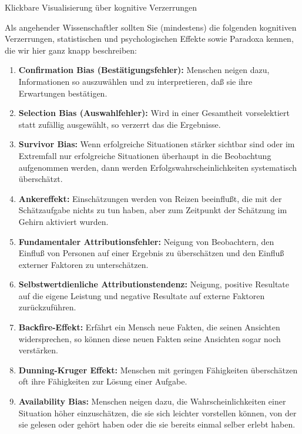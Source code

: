 

{Klickbare Visualisierung über kognitive Verzerrungen}
{}
{\href{https://upload.wikimedia.org/wikipedia/commons/6/65/Cognitive_bias_codex_en.svg}{\online}}

\pagebreak

Als angehender Wissenschaftler sollten Sie (mindestens) die folgenden kognitiven Verzerrungen,
statistischen und psychologischen Effekte sowie Paradoxa kennen, die wir hier ganz knapp beschreiben:

\begin{enumerate}
\item \label{biases}\textbf{Confirmation Bias (Bestätigungsfehler):} Menschen neigen dazu, Informationen so auszuwählen und zu
interpretieren, daß sie ihre Erwartungen bestätigen.
\item \textbf{Selection Bias (Auswahlfehler):} Wird in einer Gesamtheit vorselektiert statt zufällig ausgewählt,
so verzerrt das die Ergebnisse. 
\item \textbf{Survivor Bias:} Wenn erfolgreiche Situationen stärker sichtbar sind oder im Extremfall nur erfolgreiche
Situationen überhaupt in die Beobachtung aufgenommen werden, dann werden Erfolgswahrscheinlichkeiten systematisch überschätzt.
\item \textbf{Ankereffekt:} Einschätzungen werden von Reizen beeinflußt, die mit der Schätzaufgabe nichts zu tun haben, aber zum
Zeitpunkt der Schät\-zung im Gehirn aktiviert wurden.
\item \textbf{Fundamentaler Attributionsfehler:} Neigung von Beobachtern, 
  den Einfluß von Personen auf einer Ergebnis zu überschätzen und den Einfluß externer Faktoren zu unterschätzen. 
\item \textbf{Selbstwertdienliche Attributionstendenz:} Neigung, positive Resultate auf die eigene Leistung und
negative Resultate auf externe Faktoren zurückzuführen.
\item \textbf{Backfire-Effekt:} Erfährt ein Mensch neue Fakten, die seinen Ansichten widersprechen, so können diese neuen
Fakten seine Ansichten sogar noch verstärken.
\item \textbf{Dunning-Kruger Effekt:} Menschen mit geringen Fähigkeiten über\-schät\-zen oft ihre Fähigkeiten zur Lösung einer Aufgabe.
\item \textbf{Availability Bias:} Menschen neigen dazu, die Wahrscheinlichkeiten einer Situation höher einzuschätzen, die sie
sich leichter vorstellen kön\-nen, von der sie gelesen oder gehört haben oder die sie bereits einmal selber erlebt haben.

\end{enumerate}
